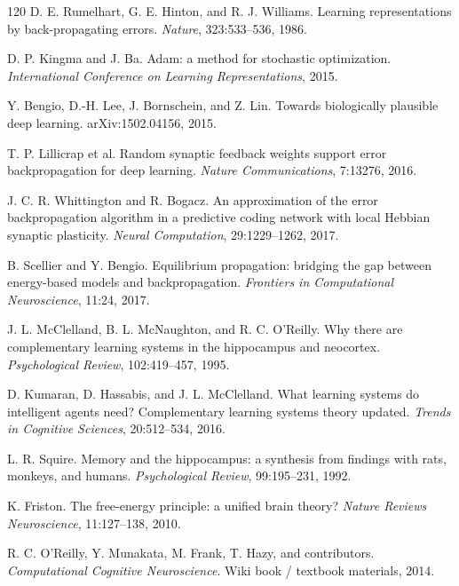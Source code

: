 \documentclass[11pt]{article}
\newcommand{\1}{\mathbf{1}}
\begin{document}
\begin{thebibliography}{120}
D. E. Rumelhart, G. E. Hinton, and R. J. Williams. Learning representations by back-propagating errors. \emph{Nature}, 323:533--536, 1986.

D. P. Kingma and J. Ba. Adam: a method for stochastic optimization. \emph{International Conference on Learning Representations}, 2015.

Y. Bengio, D.-H. Lee, J. Bornschein, and Z. Lin. Towards biologically plausible deep learning. arXiv:1502.04156, 2015.

T. P. Lillicrap et al. Random synaptic feedback weights support error backpropagation for deep learning. \emph{Nature Communications}, 7:13276, 2016.

J. C. R. Whittington and R. Bogacz. An approximation of the error backpropagation algorithm in a predictive coding network with local Hebbian synaptic plasticity. \emph{Neural Computation}, 29:1229--1262, 2017.

B. Scellier and Y. Bengio. Equilibrium propagation: bridging the gap between energy-based models and backpropagation. \emph{Frontiers in Computational Neuroscience}, 11:24, 2017.

J. L. McClelland, B. L. McNaughton, and R. C. O'Reilly. Why there are complementary learning systems in the hippocampus and neocortex. \emph{Psychological Review}, 102:419--457, 1995.

D. Kumaran, D. Hassabis, and J. L. McClelland. What learning systems do intelligent agents need? Complementary learning systems theory updated. \emph{Trends in Cognitive Sciences}, 20:512--534, 2016.

L. R. Squire. Memory and the hippocampus: a synthesis from findings with rats, monkeys, and humans. \emph{Psychological Review}, 99:195--231, 1992.

K. Friston. The free-energy principle: a unified brain theory? \emph{Nature Reviews Neuroscience}, 11:127--138, 2010.

R. C. O'Reilly, Y. Munakata, M. Frank, T. Hazy, and contributors. \emph{Computational Cognitive Neuroscience}. Wiki book / textbook materials, 2014.



\end{thebibliography}
\end{document}

